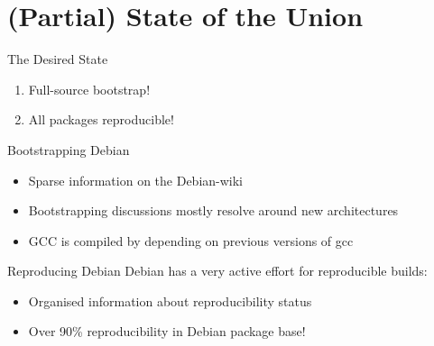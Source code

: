 \documentclass[12pt]{beamer}
\begin{document}
  \section{(Partial) State of the Union}

  \begin{frame}{The Desired State}
    \begin{center}
      \begin{enumerate}
      \item Full-source bootstrap!
      \item All packages reproducible!
      \end{enumerate}
    \end{center}
  \end{frame}

  \begin{frame}{Bootstrapping Debian}
    \begin{itemize}
    \item Sparse information on the Debian-wiki
    \item Bootstrapping discussions mostly resolve around new architectures
    \item GCC is compiled by depending on previous versions of gcc
    \end{itemize}
  \end{frame}

  \begin{frame}{Reproducing Debian}
    Debian has a very active effort for reproducible builds:

    \begin{itemize}
    \item Organised information about reproducibility status
    \item Over 90\% reproducibility in Debian package base!
    \end{itemize}
  \end{frame}
\end{document}
